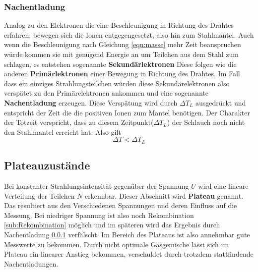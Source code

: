 \subsubsection{Nachentladung}
\label{sub:Nachentladung}
Analog zu den Elektronen die eine Beschleunigung in Richtung des Drahtes erfahren, bewegen sich die Ionen entgegengesetzt, also hin zum Stahlmantel.
Auch wenn die Beschleunigung nach Gleichung \eqref{eqn:masse} mehr Zeit beanspruchen würde kommen sie mit genügend Energie an um Teilchen aus dem Stahl zum schlagen, es entstehen sogenannte \textbf{Sekundärlektronen}
Diese folgen wie die anderen \textbf{Primärlektronen} einer Bewegung in Richtung des Drahtes. Im Fall dass ein einziges Strahlungsteilchen würden diese Sekundärelektronen also verspätet zu den Primärelektronen ankommen
und eine sogenannte \textbf{Nachentladung} erzeugen. Diese Verspätung wird durch $\Delta T_L$ ausgedrückt und entspricht der Zeit die die positiven Ionen zum Mantel benötigen.
Der Charakter der Totzeit verspricht, dass zu diesem Zeitpunkt($\Delta T_L$) der Schlauch noch nicht den Stahlmantel erreicht hat. Also gilt
\begin{equation*}
\label{eqn:vergleich}
\Delta T < \Delta T_L
\end{equation*}

\subsection{Plateauzustände}
Bei konstanter Strahlungsintensität gegenüber der Spannung $U$ wird eine lineare Verteilung der Teilchen $N$ erkennbar. Dieser Abschnitt wird 
\textbf{Plateau} genannt. Das resultiert aus den Verschiedenen Spannungen und deren Einfluss auf die Messung. Bei niedriger Spannung ist also noch Rekombination \ref{sub:Rekombination} möglich und im späteren wird das Ergebnis durch Nachentladung \ref{sub:Nachentladung} verfälscht. 
Im Bereich des Plateaus ist also annehmbar gute Messwerte zu bekommen. Durch nicht optimale Gasgemische lässt sich im Plateau ein linearer Anstieg bekommen,
verschuldet durch trotzdem stattfindende Nachentladungen.


